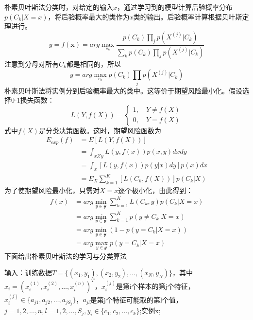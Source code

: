 朴素贝叶斯法分类时，对给定的输入$x$，通过学习到的模型计算后验概率分布$p(C_k|X=x)$，将后验概率最大的类作为$x$类的输出。后验概率计算根据贝叶斯定理进行。
\begin{equation}
	y=f(\boldsymbol{x})=arg \mathop{max}\limits_{c_k} \frac{p(C_k)\prod_jp(X^{(j)}|C_k)}{\sum_kp(C_k)\prod_jp(X^{(j)}|C_k)}
\end{equation}
注意到分母对所有$C_k$都是相同的，所以 
\begin{equation}
	y=arg \mathop{max}\limits_{c_k} p(C_k)\prod_jp(X^{(j)}|C_k)
\end{equation}
朴素贝叶斯法将实例分到后验概率最大的类中。这等价于期望风险最小化。假设选择0-1损失函数：
\begin{equation}
	L(Y,f(X))=\begin{cases}
	1,\quad Y\ne f(X)\\
	0,\quad Y=f(X)
	\end{cases}
\end{equation}
式中$f(X)$是分类决策函数。这时，期望风险函数为
\begin{equation}
	\begin{aligned}
	E_{exp}(f)&=E[L(Y,f(X))]\\
	&=\int_{x\mathcal{X}y}L(y,f(x))p(x,y)dxdy\\
	&=\int_x[L(y,f(x))p(y|x)dy]p(x)dx\\
	&=E_X\sum_{k=1}^{K}[L(C_k,f(X))]p(C_k|X)
	\end{aligned}
\end{equation}
为了使期望风险最小化，只需对$X=x$逐个极小化，由此得到：
\begin{equation}
	\begin{aligned}
	f(x)&=arg \mathop{min}_{y\in \mathcal{y}}\sum_{k=1}^{K}L(C_k,y)p(C_k|X=x)\\
	&=arg \mathop{min}_{y\in \mathcal{y}}\sum_{k=1}^{K}p(y\ne C_k|X=x)\\
	&=arg \mathop{min}_{y\in \mathcal{y}}(1-p(y=C_k|X=x))\\
	&=arg \mathop{max}_{y\in \mathcal{y}}p(y=C_k|X=x)
	\end{aligned}
\end{equation}
下面给出朴素贝叶斯法的学习与分类算法

输入：训练数据$T=\{(x_1,y_1),(x_2,y_2),\dots, (x_N,y_N)\}$，其中$x_i=(x_i^{(1)},x_i^{(2)},\dots,x_i^{(n)})^T$，$x_i^{(j)}$是第i个样本的第j个特征，$x_i^{(j)}\in \{a_{j1},a_{j2},\dots, a_{jS_j}\}$，$a_{jl}$是第j个特征可能取的第l个值，$j=1,2,\dots, n,l=1,2,\dots, S_j, y_i\in \{c_1,c_2,\dots,c_k\}$;实例x;

